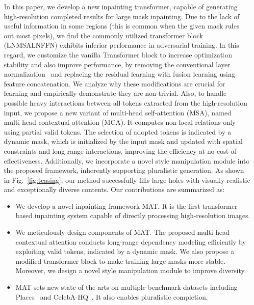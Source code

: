 \documentclass[10pt,twocolumn,letterpaper]{article}
\begin{document}
	In this paper, we develop a new inpainting transformer, capable of generating high-resolution completed results for large mask inpainting. Due to the lack of useful information in some regions (this is common when the given mask rules out most pixels), we find the commonly utilized transformer block (LNMSALNFFN) exhibits inferior performance in adversarial training. In this regard, we customize the vanilla Transformer block to increase optimization stability and also improve performance, by removing the conventional layer normalization~\cite{ba2016layer} and replacing the residual learning with fusion learning using feature concatenation. We analyze why these modifications are crucial for learning and empirically demonstrate they are non-trivial. Also, to handle possible heavy interactions between all tokens extracted from the high-resolution input, we propose a new variant of multi-head self-attention (MSA), named multi-head contextual attention (MCA). It computes non-local relations only using partial valid tokens. The selection of adopted tokens is indicated by a dynamic mask, which is initialized by the input mask and updated with spatial constraints and long-range interactions, improving the efficiency at no cost of effectiveness. Additionally, we incorporate a novel style manipulation module into the proposed framework, inherently supporting pluralistic generation. As shown in Fig.~\ref{fig:teasing}, our method successfully fills large holes with visually realistic and exceptionally diverse contents. Our contributions are summarized as:
	
	\begin{itemize}
		\item We develop a novel inpainting framework MAT. It is the first transformer-based inpainting system capable of directly processing high-resolution images.
		\item We meticulously design components of MAT. The proposed multi-head contextual attention conducts long-range dependency modeling efficiently by exploiting valid tokens, indicated by a dynamic mask. We also propose a modified transformer block to make training large masks more stable. Moreover, we design a novel style manipulation module to improve diversity.
		\item MAT sets new state of the arts on multiple benchmark datasets including Places~\cite{zhou2017places} and CelebA-HQ~\cite{karras2018progressive}. It also enables pluralistic completion.
	\end{itemize}
	
\end{document}

